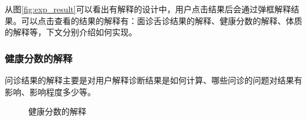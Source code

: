 从图\ref{fig:exp_result}可以看出有解释的设计中，用户点击结果后会通过弹框解释结果。可以点击查看的结果的解释有：面诊舌诊结果的解释、健康分数的解释、体质的解释等，下文分别介绍如何实现。

\subsubsection{健康分数的解释}
问诊结果的解释主要是对用户解释诊断结果是如何计算、哪些问诊的问题对结果有影响、影响程度多少等。

\begin{figure}[htbp]
    \centering
    \caption{健康分数的解释}
    \label{fig:report_expalin_score}
\end{figure}

